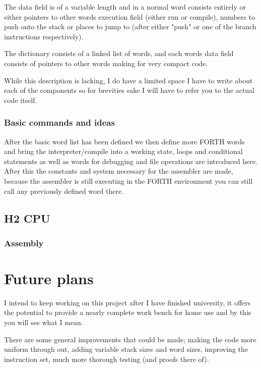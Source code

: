 \documentclass	[a4paper, 10pt]	{article}
\begin{document}
      The data field is of a variable length and in a normal word consists entirely or
      either pointers to other words execution field (either run or compile), numbers
      to push onto the stack or places to jump to (after either "push" or one of the
      branch instructions respectively).

      The dictionary consists of a linked list of words, and each words data field
      consists of pointers to other words making for very compact code.

      While this description is lacking, I do have a limited space I have to write about
      each of the components so for brevities sake I will have to refer you to the
      actual code itself.
       
      \subsubsection{Basic commands and ideas}

      After the basic word list has been defined we then define more FORTH words and
      bring the interpreter/compile into a working state, loops and conditional
      statements as well as words for debugging and file operations are introduced
      here. After this the constants and system necessary for the assembler are made,
      because the assembler is still executing in the FORTH environment you can still
      call any previously defined word there.
    \subsection{H2 CPU}
      \subsubsection{Assembly}

   \section{Future plans}

    I intend to keep working on this project after I have finished university, it offers the
    potential to provide a nearly complete work bench for home use and by this you will see
    what I mean.

    There are some general improvements that could be made; making the code more uniform
    through out, adding variable stack sizes and word sizes, improving the instruction set,
    much more thorough testing (and proofs there of).
\end{document}
